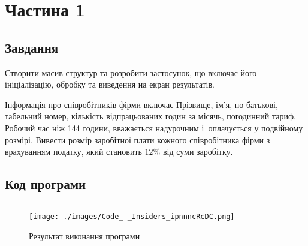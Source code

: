 \section{Частина 1}
\label{sec:task1}

\subsection{Завдання}
\label{subsec:task1_task}

Створити масив структур та розробити застосунок,
що включає його ініціалізацію, обробку та виведення
на екран результатів.

Інформація про співробітників фірми включає
Прізвище, ім'я, по-батькові, табельний номер,
кількість відпрацьованих годин за місячь,
погодинний тариф. Робочий час ніж 144 години,
вважається надурочним і оплачується у подвійному розмірі.
Вивести розмір заробітної плати кожного співробітника фірми
з врахуванням податку, який становить $12\%$ від суми заробітку.

\subsection{Код програми}
\label{subsec:task1_code}
\inputminted{cpp}{../src/task1.cpp}

\begin{figure}[!ht]
    \centering
    \texttt{[image: ./images/Code\_-\_Insiders\_ipnnncRcDC.png]}
    \caption{Результат виконання програми}
    \label{fig:task1_exec}
\end{figure}
